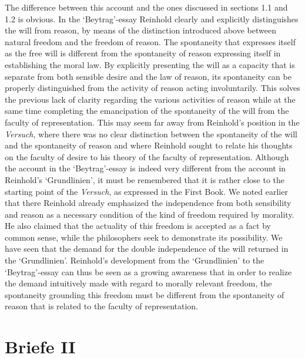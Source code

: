   The difference between this account and the ones discussed in sections 1.1 and 1.2 is obvious. In the `Beytrag'{-}essay Reinhold clearly and explicitly distinguishes the will from reason, by means of the distinction introduced above between natural freedom and the freedom of reason. The spontaneity that expresses itself as the free will is different from the spontaneity of reason expressing itself in establishing the moral law. By explicitly presenting the will as a capacity that is separate from both sensible desire and the law of reason, its spontaneity can be properly distinguished from the activity of reason acting involuntarily. This solves the previous lack of clarity regarding the various activities of reason while at the same time completing the emancipation of the spontaneity of the will from the faculty of representation. This may seem far away from Reinhold's position in the \textit{Versuch}, where there was no clear distinction between the spontaneity of the will and the spontaneity of reason and where Reinhold sought to relate his thoughts on the faculty of desire to his theory of the faculty of representation. Although the account in the `Beytrag'{-}essay is indeed very different from the account in Reinhold's `Grundlinien', it must be remembered that it is rather close to the starting point of the \textit{Versuch}, as expressed in the First Book. We noted earlier that there Reinhold already emphasized the independence from both sensibility and reason as a necessary condition of the kind of freedom required by morality. He also claimed that the actuality of this freedom is accepted as a fact by common sense, while the philosophers seek to demonstrate its possibility. We have seen that the demand for the double independence of the will returned in the `Grundlinien'. Reinhold's development from the `Grundlinien' to the `Beytrag'{-}essay can thus be seen as a growing awareness that in order to realize the demand intuitively made with regard to morally relevant freedom, the spontaneity grounding this freedom must be different from the spontaneity of reason that is related to the faculty of representation. 


\section{Briefe II}



